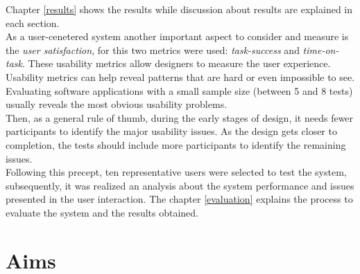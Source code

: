 Chapter \ref{results} shows the results while discussion about results are
explained in each section.\\
As a user-cenetered system another important aspect 
to consider and measure is the \textit{user satisfaction}, for this two
metrics were used: \textit{task-success} and \textit
{time-on-task}. These usability metrics allow designers to measure the user experience.
\\ Usability
metrics can help reveal patterns that are hard or even impossible to
see. Evaluating software applications with a small sample size (between 5 and 8 tests)
usually reveals the most obvious usability problems\cite{albert2013measuring}.\\ Then, as
a general rule of thumb, during the early stages of design, it needs
fewer participants to identify the major usability issues. As the
design gets closer to completion, the tests should include more
participants to identify the remaining
issues\cite{albert2013measuring}.\\ 
Following this precept, ten representative users were selected to test
the system, subsequently, it was realized an analysis about the system
performance and issues presented in the user interaction. The chapter
\ref{evaluation} explains the process to evaluate the system and the
results obtained.

\section{Aims}

